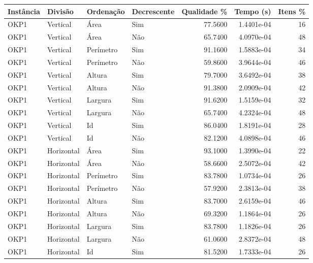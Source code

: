 \begin{tabular}{llllrrr}
\hline
Instância & Divisão     & Ordenação & Decrescente & Qualidade \% & Tempo (s)  & Itens \% \\
\hline
OKP1      & Vertical    & Área      & Sim         & 77.5600      & 1.4401e-04 & 16       \\
OKP1      & Vertical    & Área      & Não         & 65.7400      & 4.0970e-04 & 48       \\
OKP1      & Vertical    & Perímetro & Sim         & 91.1600      & 1.5883e-04 & 34       \\
OKP1      & Vertical    & Perímetro & Não         & 59.8600      & 3.9644e-04 & 46       \\
OKP1      & Vertical    & Altura    & Sim         & 79.7000      & 3.6492e-04 & 38       \\
OKP1      & Vertical    & Altura    & Não         & 91.3800      & 2.0909e-04 & 42       \\
OKP1      & Vertical    & Largura   & Sim         & 91.6200      & 1.5159e-04 & 32       \\
OKP1      & Vertical    & Largura   & Não         & 65.7400      & 4.2324e-04 & 48       \\
OKP1      & Vertical    & Id        & Sim         & 86.0400      & 1.8191e-04 & 28       \\
OKP1      & Vertical    & Id        & Não         & 82.1200      & 4.0898e-04 & 46       \\
OKP1      & Horizontal  & Área      & Sim         & 93.1000      & 1.3990e-04 & 22       \\
OKP1      & Horizontal  & Área      & Não         & 58.6600      & 2.5072e-04 & 42       \\
OKP1      & Horizontal  & Perímetro & Sim         & 83.7800      & 1.0734e-04 & 26       \\
OKP1      & Horizontal  & Perímetro & Não         & 57.9200      & 2.3813e-04 & 38       \\
OKP1      & Horizontal  & Altura    & Sim         & 83.7000      & 2.6159e-04 & 46       \\
OKP1      & Horizontal  & Altura    & Não         & 69.3200      & 1.1864e-04 & 26       \\
OKP1      & Horizontal  & Largura   & Sim         & 83.7800      & 1.1826e-04 & 26       \\
OKP1      & Horizontal  & Largura   & Não         & 61.0600      & 2.8372e-04 & 48       \\
OKP1      & Horizontal  & Id        & Sim         & 81.5200      & 1.7333e-04 & 26       \\

\end{tabular}
